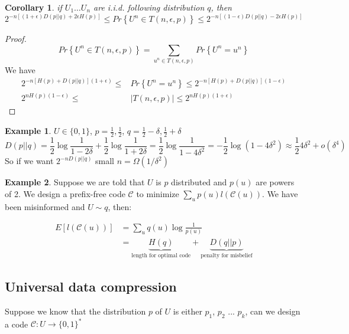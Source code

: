 \documentclass{article}
\newtheorem{corollary}{Corollary}[theorem]
\theoremstyle{definition} %
\newtheorem{example}{Example}
\renewcommand{\Pr}[1]{Pr\left\{#1\right\}}
\newcommand{\Ex}[1]{E\left[#1\right]}
\def\C{\mathscr{C}}
\begin{document}
\begin{corollary}
  if $U_1 \dots U_n$ are i.i.d. following distribution $q$, then
  \[
    2^{-n[(1+\epsilon)D(p||q)+2\epsilon H(p)]}
    \leq
    \Pr{U^n \in T(n,\epsilon,p)}
    \leq
    2^{-n[(1-\epsilon)D(p||q) - 2\epsilon H(p)]}
  \]
\end{corollary}

\begin{proof}
  \[
    \Pr{U^n \in T(n,\epsilon,p)} = \sum_{u^n \in T(n, \epsilon, p)} \Pr{U^n = u^n}
  \]
  We have
  \begin{align*}
    2^{-n[H(p) + D(p||q)](1+\epsilon)}
    \leq
    &\Pr{U^n = u^n}
    \leq
    2^{-n[H(p) + D(p||q)](1-\epsilon)}\\
    2^{nH(p)(1-\epsilon)}
    \leq
    &|T(n, \epsilon, p)|
    \leq
    2^{nH(p)(1+\epsilon)}
  \end{align*}
\end{proof}

\begin{example}
  $U \in \{0,1\}$, $p=\frac 1 2, \frac 1 2$, $q=\frac 1 2 - \delta, \frac 1 2 + \delta$
  \[
    D(p||q) = \frac 1 2 \log \frac 1 {1-2\delta} + \frac 1 2 \log \frac 1 {1+2\delta} = \frac 1 2 \log \frac 1 {1-4\delta^2} = - \frac 1 2 \log (1-4\delta^2) \approx \frac 1 2 4\delta^2 + o(\delta^4)
  \]
  So if we want $2^{-n D(p||q)}$ small $n=\Omega(1/\delta^2)$
\end{example}

\begin{example}
  Suppose we are told that $U$ is $p$ distributed and $p(u)$ are powers of 2. We design a prefix-free code $\C$ to minimize $\sum_u p(u) l(\C(u))$. We have been misinformed and $U\sim q$, then:

  \begin{align*}
    \Ex{l(\C(u))}
    &= \sum_u q(u) \log \frac 1 {p(u)}\\
    &= \underbrace{H(q)}_{\text{length for optimal code}} + \underbrace{D(q||p)}_{\text{penalty for misbelief}}
  \end{align*}
\end{example}

\subsection{Universal data compression}

Suppose we know that the distribution $p$ of $U$ is either $p_1$, $p_2$ ... $p_k$, can we design a code $\C: U \to \{0,1\}^*$
\end{document}
